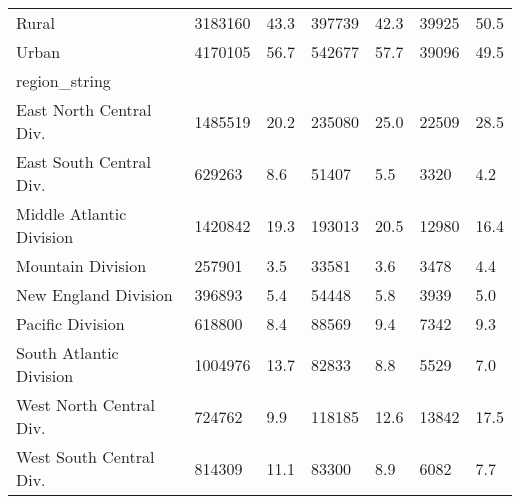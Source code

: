 \begin{longtable}{lllllll}
\midrule
Rural & 3183160 & 43.3 & 397739 & 42.3 & 39925 & 50.5 \\ 
Urban & 4170105 & 56.7 & 542677 & 57.7 & 39096 & 49.5 \\ 
\midrule
\multicolumn{1}{l}{region\_string} \\ 
\midrule
East North Central Div. & 1485519 & 20.2 & 235080 & 25.0 & 22509 & 28.5 \\ 
East South Central Div. & 629263 & 8.6 & 51407 & 5.5 & 3320 & 4.2 \\ 
Middle Atlantic Division & 1420842 & 19.3 & 193013 & 20.5 & 12980 & 16.4 \\ 
Mountain Division & 257901 & 3.5 & 33581 & 3.6 & 3478 & 4.4 \\ 
New England Division & 396893 & 5.4 & 54448 & 5.8 & 3939 & 5.0 \\ 
Pacific Division & 618800 & 8.4 & 88569 & 9.4 & 7342 & 9.3 \\ 
South Atlantic Division & 1004976 & 13.7 & 82833 & 8.8 & 5529 & 7.0 \\ 
West North Central Div. & 724762 & 9.9 & 118185 & 12.6 & 13842 & 17.5 \\ 
West South Central Div. & 814309 & 11.1 & 83300 & 8.9 & 6082 & 7.7 \\ 
\bottomrule
\end{longtable}

